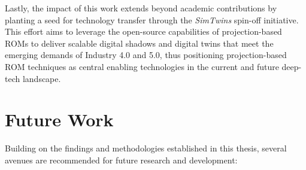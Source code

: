 Lastly, the impact of this work extends beyond academic contributions by planting a seed for technology transfer through the \textit{SimTwins} spin-off initiative. This effort aims to leverage the open-source capabilities of projection-based ROMs to deliver scalable digital shadows and digital twins that meet the emerging demands of Industry 4.0 and 5.0, thus positioning projection-based ROM techniques as central enabling technologies in the current and future deep-tech landscape.

\section*{Future Work}

Building on the findings and methodologies established in this thesis, several avenues are recommended for future research and development:
